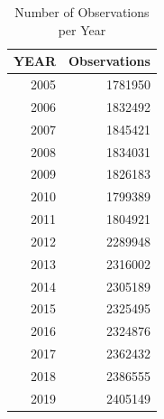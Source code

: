 \begin{table}[ht]
\centering
\begin{tabular}{rr}
  \hline
YEAR & Observations \\ 
  \hline
2005 & 1781950 \\ 
  2006 & 1832492 \\ 
  2007 & 1845421 \\ 
  2008 & 1834031 \\ 
  2009 & 1826183 \\ 
  2010 & 1799389 \\ 
  2011 & 1804921 \\ 
  2012 & 2289948 \\ 
  2013 & 2316002 \\ 
  2014 & 2305189 \\ 
  2015 & 2325495 \\ 
  2016 & 2324876 \\ 
  2017 & 2362432 \\ 
  2018 & 2386555 \\ 
  2019 & 2405149 \\ 
   \hline
\end{tabular}
\caption{Number of Observations per Year} 
\label{tab:obs_year}
\end{table}
